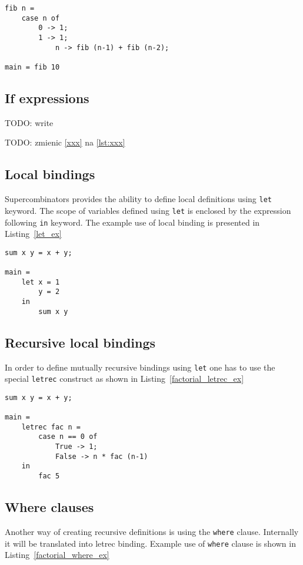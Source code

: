 \documentclass[a4paper]{report}
\begin{document}
\begin{lstlisting}[label=lst:case_ex,caption={Fibonacci with case}]
fib n =
    case n of
        0 -> 1;
        1 -> 1;
            n -> fib (n-1) + fib (n-2);

main = fib 10
\end{lstlisting}

\subsection{If expressions}

TODO: write

TODO: zmienic \ref{xxx} na \ref{lst:xxx}

\subsection{Local bindings}
Supercombinators provides the ability to define local definitions using
\texttt{let} keyword. The scope of variables defined using \texttt{let} is
enclosed by the expression following \texttt{in} keyword. The example use of
local binding is presented in Listing~\ref{let_ex}


\begin{lstlisting}[label=let_ex,caption={Local \texttt{let} binding.}]
sum x y = x + y;

main =
    let x = 1
        y = 2
    in
        sum x y
\end{lstlisting}

\subsection{Recursive local bindings}
In order to define mutually recursive bindings using \texttt{let} one has to use the
special \texttt{letrec} construct as shown in Listing~\ref{factorial_letrec_ex}


\begin{lstlisting}[label=factorial_letrec_ex,caption={Factorial function using \texttt{letrec}.}]
sum x y = x + y;

main =
    letrec fac n =
        case n == 0 of
            True -> 1;
            False -> n * fac (n-1)
    in
        fac 5
\end{lstlisting}

\subsection{Where clauses}
Another way of creating recursive definitions is using the \texttt{where}
clause. Internally it will be translated into letrec binding. Example use of
\texttt{where} clause is shown in Listing~\ref{factorial_where_ex}
\end{document}
